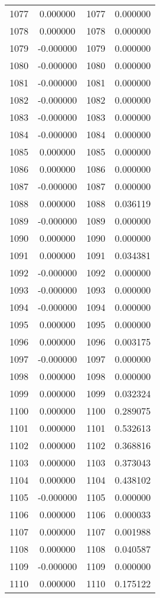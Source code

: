 \documentclass[12pt]{article}
\begin{document}
\begin{longtable}{@{}cccc@{}}
1077 & 0.000000 & 1077 & 0.000000 \\
1078 & 0.000000 & 1078 & 0.000000 \\
1079 & -0.000000 & 1079 & 0.000000 \\
1080 & -0.000000 & 1080 & 0.000000 \\
1081 & -0.000000 & 1081 & 0.000000 \\
1082 & -0.000000 & 1082 & 0.000000 \\
1083 & -0.000000 & 1083 & 0.000000 \\
1084 & -0.000000 & 1084 & 0.000000 \\
1085 & 0.000000 & 1085 & 0.000000 \\
1086 & 0.000000 & 1086 & 0.000000 \\
1087 & -0.000000 & 1087 & 0.000000 \\
1088 & 0.000000 & 1088 & 0.036119 \\
1089 & -0.000000 & 1089 & 0.000000 \\
1090 & 0.000000 & 1090 & 0.000000 \\
1091 & 0.000000 & 1091 & 0.034381 \\
1092 & -0.000000 & 1092 & 0.000000 \\
1093 & -0.000000 & 1093 & 0.000000 \\
1094 & -0.000000 & 1094 & 0.000000 \\
1095 & 0.000000 & 1095 & 0.000000 \\
1096 & 0.000000 & 1096 & 0.003175 \\
1097 & -0.000000 & 1097 & 0.000000 \\
1098 & 0.000000 & 1098 & 0.000000 \\
1099 & 0.000000 & 1099 & 0.032324 \\
1100 & 0.000000 & 1100 & 0.289075 \\
1101 & 0.000000 & 1101 & 0.532613 \\
1102 & 0.000000 & 1102 & 0.368816 \\
1103 & 0.000000 & 1103 & 0.373043 \\
1104 & 0.000000 & 1104 & 0.438102 \\
1105 & -0.000000 & 1105 & 0.000000 \\
1106 & 0.000000 & 1106 & 0.000033 \\
1107 & 0.000000 & 1107 & 0.001988 \\
1108 & 0.000000 & 1108 & 0.040587 \\
1109 & -0.000000 & 1109 & 0.000000 \\
1110 & 0.000000 & 1110 & 0.175122 \\

\end{longtable}
\end{document}
